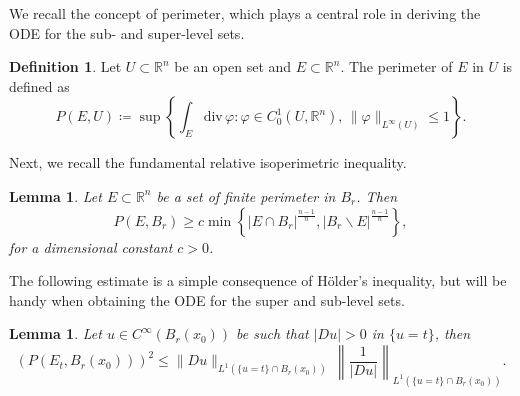 \documentclass[12pt,a4paper]{amsart}
\numberwithin{equation}{section} %
\newtheorem{lemma}[theorem]{Lemma}
\theoremstyle{definition}
\newtheorem{definition}[theorem]{Definition}
\theoremstyle{remark}
\begin{document}
We recall the concept of perimeter, which plays a central role in deriving the ODE for the sub- and super-level sets.

\begin{definition}\label{def of perimeter}
Let $U \subset \mathbb{R}^n$ be an open set and $E \subset \mathbb{R}^n$. The perimeter of $E$ in $U$ is defined as
$$
    P(E,U) \coloneqq \sup\left\{\int_E \mbox{div}\, \varphi \colon \varphi \in C^1_0(U,\mathbb{R}^n),\, \|\varphi\|_{L^\infty(U)} \leq 1 \right\}.
$$
\end{definition}

Next, we recall the fundamental relative isoperimetric inequality.

\begin{lemma}\label{relativ isoperimetric inequality}
Let $E \subset \mathbb{R}^n$ be a set of finite perimeter in $B_r$. Then
$$
    P(E,B_r) \geq c \min\left\{|E \cap B_r|^{\frac{n-1}{n}},|B_r \backslash E|^{\frac{n-1}{n}} \right\},
$$
for a dimensional constant $c>0$.
\end{lemma}

The following estimate is a simple consequence of H\"older's inequality, but will be handy when obtaining the ODE for the super and sub-level sets.

\begin{lemma}\label{ineq for the perimeter}
Let $u \in C^\infty(B_r(x_0))$ be such that $|Du|>0$ in $\{u = t\}$, then
$$
    \left(P(E_t,B_r(x_0))\right)^2 \leq \|Du\|_{L^1(\{u = t\} \cap B_r(x_0))}\, \left\|\frac{1}{|Du|}\right\|_{L^1(\{u = t\}\cap B_r(x_0))}.
$$
\end{lemma}
\end{document}
